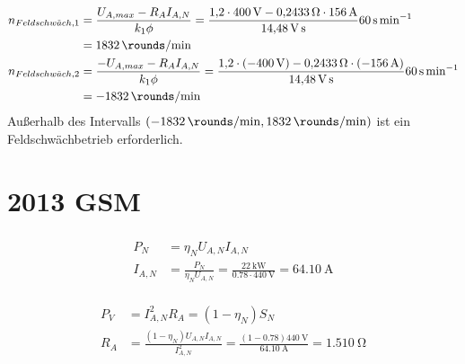 \documentclass[11pt,a4paper]{scrartcl}
\newcommand{\mybr}[1]{\left(#1\right)}
\newcommand{\0}{_{\mybr{0}}}
\newcommand{\1}{_{\mybr{1}}}
\newcommand{\2}{_{\mybr{2}}}
\begin{document}
\subsection{}
\begin{align}
n_{Feldschw\ddot{a}ch,1}&=\frac{U_{A,max}-R_A I_{A,N}}{k_1\phi}=\frac{\num{1.2}\cdot\SI{400}{\volt}-\SI{0.2433}{\ohm}\cdot\SI{156}{\ampere}}{\SI{14.48}{\volt\second}}\SI{60}{\second\per\minute}\\
&=\SI{1832}{\rounds\per\minute}\\
n_{Feldschw\ddot{a}ch,2}&=\frac{-U_{A,max}-R_A I_{A,N}}{k_1\phi}=\frac{\num{1.2}\cdot\mybr{\SI{-400}{\volt}}-\SI{0.2433}{\ohm}\cdot\mybr{\SI{-156}{\ampere}}}{\SI{14.48}{\volt\second}}\SI{60}{\second\per\minute}\\
&=\SI{-1832}{\rounds\per\minute}
\end{align}
Außerhalb des Intervalls $\mybr{\SI{-1832}{\rounds\per\minute},\SI{1832}{\rounds\per\minute}}$ ist ein Feldschwächbetrieb erforderlich.

\clearpage
\part{2013 GSM}
\section{}
\subsection{}
\begin{align}
P_N&=\eta_N U_{A,N} I_{A,N}\\
I_{A,N}&=\frac{P_N}{\eta_N U_{A,N}}=\frac{\SI{22}{\kilo\watt}}{\num{0.78}\cdot\SI{440}{\volt}}=\SI{64.10}{\ampere}
\end{align}

\subsection{}
\begin{align}
P_V&=I_{A,N}^2 R_A=\mybr{1-\eta_N}S_N\\
R_A&=\frac{\mybr{1-\eta_N} U_{A,N} I_{A,N}}{I_{A,N}^2}=\frac{\mybr{1-\num{0.78}}\SI{440}{\volt}}{\SI{64.10}{\ampere}}=\SI{1.510}{\ohm}
\end{align}
\end{document}
